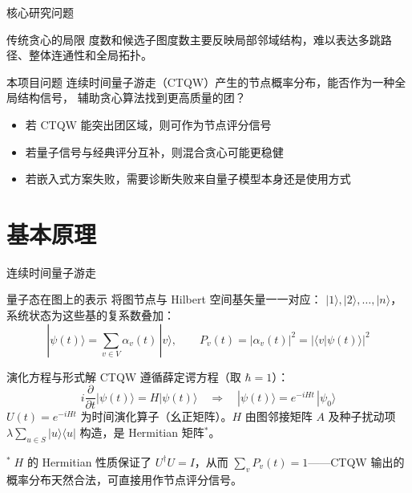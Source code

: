 \documentclass[aspectratio=169,10pt]{ctexbeamer}
\begin{document}
\begin{frame}{核心研究问题}
  \begin{block}{传统贪心的局限}
    度数和候选子图度数主要反映局部邻域结构，难以表达多跳路径、整体连通性和全局拓扑。
  \end{block}

  \vspace{0.8em}
  \begin{alertblock}{本项目问题}
    连续时间量子游走（CTQW）产生的节点概率分布，能否作为一种全局结构信号，
    辅助贪心算法找到更高质量的团？
  \end{alertblock}

  \vspace{0.8em}
  \begin{itemize}
    \item 若 CTQW 能突出团区域，则可作为节点评分信号
    \item 若量子信号与经典评分互补，则混合贪心可能更稳健
    \item 若嵌入式方案失败，需要诊断失败来自量子模型本身还是使用方式
  \end{itemize}
\end{frame}

\section{基本原理}

\begin{frame}{连续时间量子游走}
  \begin{block}{量子态在图上的表示}
    将图节点与 Hilbert 空间基矢量一一对应：
    $|1\rangle,|2\rangle,\ldots,|n\rangle$，
    系统状态为这些基的复系数叠加：
    \[
      |\psi(t)\rangle = \sum_{v\in V} \alpha_v(t)\,|v\rangle,
      \qquad
      P_v(t) = |\alpha_v(t)|^2 = |\langle v|\psi(t)\rangle|^2
    \]
  \end{block}

  \vspace{0.1em}

  \begin{block}{演化方程与形式解}
    CTQW 遵循薛定谔方程（取 $\hbar=1$）：
    \[
      i\frac{\partial}{\partial t}|\psi(t)\rangle = H|\psi(t)\rangle
      \quad\Longrightarrow\quad
      |\psi(t)\rangle = e^{-iHt}\,|\psi_0\rangle
    \]
    $U(t)=e^{-iHt}$ 为时间演化算子（幺正矩阵）。$H$ 由图邻接矩阵 $A$
    及种子扰动项 $\lambda\sum_{u\in S}|u\rangle\langle u|$ 构造，是 Hermitian 矩阵$^{*}$。
  \end{block}

  {\small $^{*}\;H$ 的 Hermitian 性质保证了 $U^\dagger U=I$，从而
  $\sum_v P_v(t)=1$——CTQW 输出的概率分布天然合法，可直接用作节点评分信号。}
\end{frame}
\end{document}
